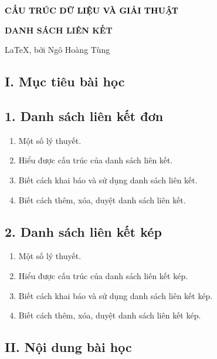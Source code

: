 
\begin{center}
    \textbf{\textcolor{black}{\large\LARGE CẤU TRÚC DỮ LIỆU VÀ GIẢI THUẬT}}

    \textbf{\large DANH SÁCH LIÊN KẾT}

    \large\LaTeX, bởi Ngô Hoàng Tùng
\end{center}


\subsection*{I. Mục tiêu bài học}
\subsection*{1. Danh sách liên kết đơn}
\begin{enumerate}[label=\alph*.]
    \item Một số lý thuyết.
    \item Hiểu được cấu trúc của danh sách liên kết.
    \item Biết cách khai báo và sử dụng danh sách liên kết.
    \item Biết cách thêm, xóa, duyệt danh sách liên kết.
\end{enumerate}
\subsection*{2. Danh sách liên kết kép}
\begin{enumerate}[label=\alph*.]
    \item Một số lý thuyết.
    \item Hiểu được cấu trúc của danh sách liên kết kép.
    \item Biết cách khai báo và sử dụng danh sách liên kết kép.
    \item Biết cách thêm, xóa, duyệt danh sách liên kết kép.
\end{enumerate}
\subsection*{II. Nội dung bài học}
